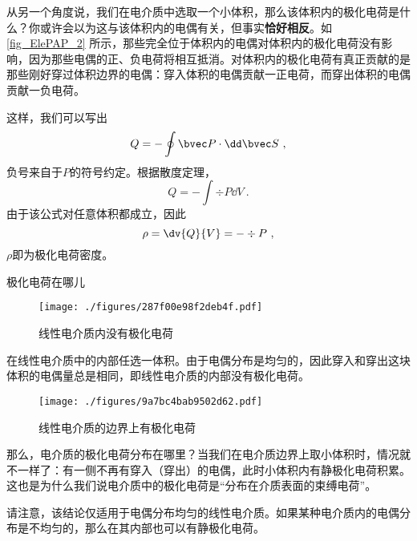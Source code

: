 从另一个角度说，我们在电介质中选取一个小体积，那么该体积内的极化电荷是什么？你或许会以为这与该体积内的电偶有关，但事实\textbf{恰好相反}。如\autoref{fig_ElePAP_2} 所示，那些完全位于体积内的电偶对体积内的极化电荷没有影响，因为那些电偶的正、负电荷将相互抵消。对体积内的极化电荷有真正贡献的是那些刚好穿过体积边界的电偶：穿入体积的电偶贡献一正电荷，而穿出体积的电偶贡献一负电荷。

这样，我们可以写出
$$
Q= - \oint \bvec P \cdot \dd \bvec S~,
$$
负号来自于$P$的符号约定。根据散度定理，
$$
Q= - \int \div P \dd V~.
$$
由于该公式对任意体积都成立，因此
\begin{equation}
\rho = \dv{Q}{V}= - \div P~,
\end{equation}
$\rho$即为极化电荷密度。

\begin{example}{极化电荷在哪儿}
\begin{figure}[ht]
\centering
\texttt{[image: ./figures/287f00e98f2deb4f.pdf]}
\caption{线性电介质内没有极化电荷} \label{fig_ElePAP_3}
\end{figure}

在线性电介质中的内部任选一体积。由于电偶分布是均匀的，因此穿入和穿出这块体积的电偶量总是相同，即线性电介质的内部没有极化电荷。

\begin{figure}[ht]
\centering
\texttt{[image: ./figures/9a7bc4bab9502d62.pdf]}
\caption{线性电介质的边界上有极化电荷} \label{fig_ElePAP_4}
\end{figure}
那么，电介质的极化电荷分布在哪里？当我们在电介质边界上取小体积时，情况就不一样了：有一侧不再有穿入（穿出）的电偶，此时小体积内有静极化电荷积累。这也是为什么我们说电介质中的极化电荷是“分布在介质表面的束缚电荷”。

请注意，该结论仅适用于电偶分布均匀的线性电介质。如果某种电介质内的电偶分布是不均匀的，那么在其内部也可以有静极化电荷。
\end{example}
